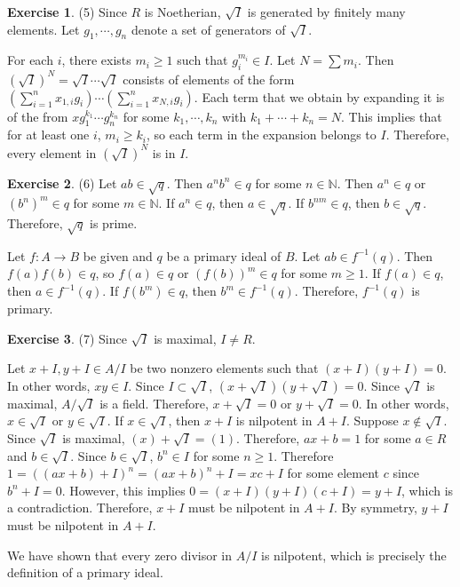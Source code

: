 \documentclass[12pt, psamsfonts]{amsart}
\theoremstyle{definition}
\newtheorem*{exer}{Exercise}
\theoremstyle{remark}
\numberwithin{equation}{section}
\begin{document}
\begin{exer}{(5)}
  Since $R$ is Noetherian, $\sqrt{I}$ is generated by finitely many elements.
  Let $g_1, \cdots, g_n$ denote a set of generators of $\sqrt{I}$.

  For each $i$, there exists $m_i \geq 1$ such that $g_i^{m_i} \in I$.
  Let $N = \sum m_i$.
  Then $(\sqrt{I})^N = \sqrt{I} \cdots \sqrt{I}$ consists of elements of the form $(\sum_{i=1}^{n} x_{1, i}g_{i}) \cdots (\sum_{i=1}^{n} x_{N, i}g_{i})$.
  Each term that we obtain by expanding it is of the from $xg_1^{k_1} \cdots g_n^{k_n}$ for some $k_1, \cdots, k_n$ with $k_1 + \cdots + k_n = N$.
  This implies that for at least one $i$, $m_i \geq k_i$, so each term in the expansion belongs to $I$.
  Therefore, every element in $(\sqrt{I})^N$ is in $I$.
\end{exer}

\begin{exer}{(6)}
  Let $ab \in \sqrt{q}$.
  Then $a^nb^n \in q$ for some $n \in \mathbb{N}$.
  Then $a^n \in q$ or $(b^n)^m \in q$ for some $m \in \mathbb{N}$.
  If $a^n \in q$, then $a \in \sqrt{q}$.
  If $b^{nm} \in q$, then $b \in \sqrt{q}$.
  Therefore, $\sqrt{q}$ is prime.

  Let $f:A \rightarrow B$ be given and $q$ be a primary ideal of $B$.
  Let $ab \in f^{-1}(q)$.
  Then $f(a)f(b) \in q$, so $f(a) \in q$ or $(f(b))^m \in q$ for some $m \geq 1$.
  If $f(a) \in q$, then $a \in f^{-1}(q)$.
  If $f(b^m) \in q$, then $b^m \in f^{-1}(q)$.
  Therefore, $f^{-1}(q)$ is primary.
\end{exer}

\begin{exer}{(7)}
  Since $\sqrt{I}$ is maximal, $I \ne R$.

  Let $x + I, y + I \in A / I$ be two nonzero elements such that $(x + I)(y + I) = 0$.
  In other words, $xy \in I$.
  Since $I \subset \sqrt{I}$, $(x + \sqrt{I})(y + \sqrt{I}) = 0$.
  Since $\sqrt{I}$ is maximal, $A / \sqrt{I}$ is a field.
  Therefore, $x + \sqrt{I} = 0$ or $y + \sqrt{I} = 0$.
  In other words, $x \in \sqrt{I}$ or $y \in \sqrt{I}$.
  If $x \in \sqrt{I}$, then $x + I$ is nilpotent in $A + I$.
  Suppose $x \notin \sqrt{I}$.
  Since $\sqrt{I}$ is maximal, $(x) + \sqrt{I} = (1)$.
  Therefore, $ax + b = 1$ for some $a \in R$ and $b \in \sqrt{I}$.
  Since $b \in \sqrt{I}$, $b^n \in I$ for some $n \geq 1$.
  Therefore $1 = ((ax + b) + I)^n = (ax + b)^n + I = xc + I$ for some element $c$ since $b^n + I = 0$.
  However, this implies $0 = (x + I)(y + I)(c + I) = y + I$, which is a contradiction.
  Therefore, $x + I$ must be nilpotent in $A + I$.
  By symmetry, $y + I$ must be nilpotent in $A + I$.
  
  We have shown that every zero divisor in $A / I$ is nilpotent, which is precisely the definition of a primary ideal.
\end{exer}
\end{document}
